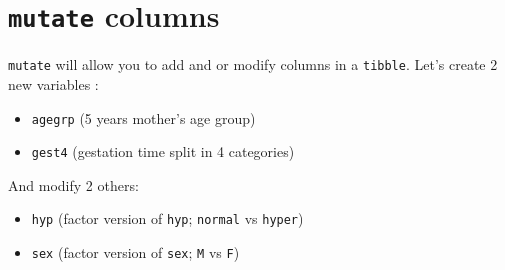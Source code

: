\documentclass[
]{book}
\providecommand{\tightlist}{%
  \setlength{\itemsep}{0pt}\setlength{\parskip}{0pt}}
\begin{document}
\section{\texorpdfstring{\texttt{mutate} columns}{mutate columns}}\label{mutate-columns}

\texttt{mutate} will allow you to add and or modify columns in a \texttt{tibble}.
Let's create 2 new variables :

\begin{itemize}
\tightlist
\item
  \texttt{agegrp} (5 years mother's age group)
\item
  \texttt{gest4} (gestation time split in 4 categories)
\end{itemize}

And modify 2 others:

\begin{itemize}
\tightlist
\item
  \texttt{hyp} (factor version of \texttt{hyp}; \texttt{normal} vs \texttt{hyper})
\item
  \texttt{sex} (factor version of \texttt{sex}; \texttt{M} vs \texttt{F})
\end{itemize}
\end{document}
